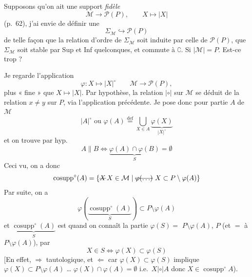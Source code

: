 \documentclass[11pt,a4paper]{article}
\begin{document}
Supposons qu'on ait une  support    \emph{fidèle}
\[
  \mathcal{M} \longrightarrow \mathcal{P}(P), \qquad X \longmapsto |X|
\]
 (p.~62), j'ai envie  de définir une  
\[
  \Sigma_{\mathcal{M}} \hookrightarrow \mathcal{P}(P)
\]
de telle façon que la relation d'ordre de $\Sigma_{\mathcal{M}}$ soit induite par celle de $\mathcal{P}(P)$, que $\Sigma_{\mathcal{M}}$ soit stable par Sup et Inf quelconques, et commute à $\complement$. Si $|\mathcal{M}| = P$. Est-ce trop  \ill{}  ?


Je regarde l'application
\[
  \varphi : X \longmapsto |X|^{\circ} \qquad \mathcal{M} \longrightarrow \mathcal{P}(P),
\]
plus « fine » que $X \mapsto |X|$. Par hypothèse, la relation $|\circ|$ sur $\mathcal{M}$ se déduit de la \struck{\ill{}} relation $x \neq y$ sur $P$, via l'application précédente. Je pose donc pour  partie $A$ de $\mathcal{M}$
\[
  |A|^{\circ} \text{ ou } \varphi(A) \overset{\mathrm{def}}{=} \bigcup_{X \in A} \underbrace{\varphi(X)}_{|X|^{\circ}}
\]
et on trouve par hyp.
\[
  A \parallel B \Longleftrightarrow \underbrace{\varphi(A) \cap \varphi(B)}_{S} = \emptyset
\]
Ceci vu, on a donc
\[
  \operatorname{cosupp}^{\circ}(A) = \{ \text{\struck{$X$}}\, X \in \mathcal{M} \mid \text{\struck{$\varphi(\ldots)$}}\ X \subset P \setminus \varphi(A) \}
\]
Par suite, on a
\[
  \varphi(\underbrace{\operatorname{cosupp}^{\circ}(A)}_{S}) \subset P \setminus \varphi(A)
\]
 et $\underbrace{\operatorname{cosupp}^{\circ}(A)}_{S}$ est  quand on connaît  la partie $\varphi(S) =$ \struck{\ill{}} $P \setminus \varphi(A)$,   $P$ (et $=$ à $P \setminus \varphi(A)$), par
\[
  X \in S \Longleftrightarrow \varphi(X) \subset \varphi(S)
\]
[En effet, $\Rightarrow$ tautologique, et $\Leftarrow$ car $\varphi(X) \subset \varphi(S)$ implique $\varphi(X) \subset P \setminus \varphi(A)$ … $\varphi(X) \cap \varphi(A) = \emptyset$ i.e.\ $X \mathrel{|\circ|} A$ donc $X \in \operatorname{cosupp}^{\circ} A$).
\end{document}
